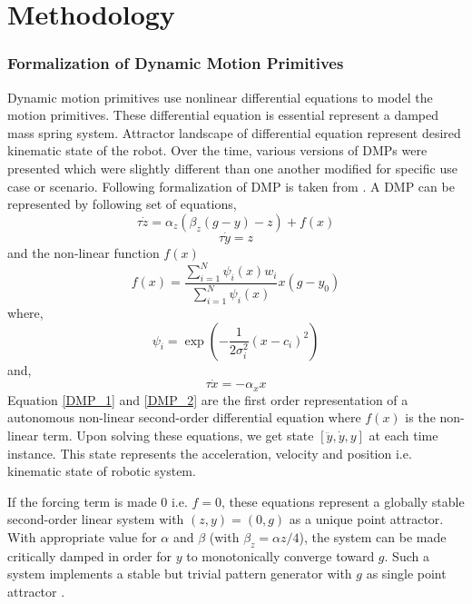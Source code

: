 \chapter{Methodology}


\subsection{Formalization of Dynamic Motion Primitives}

\par Dynamic motion primitives use nonlinear differential equations to model the motion primitives. These differential equation is essential represent a damped mass spring system. Attractor landscape of differential equation represent desired kinematic state of the robot. Over the time, various versions of DMPs were presented which were slightly different than one another modified for specific use case or scenario. Following formalization of DMP is taken from \cite{ijspeert2013dynamical}.
A DMP can be represented by following set of equations,  
\begin{equation}\label{DMP_1}
\tau\dot{z} = \alpha_{z}(\beta_{z}(g - y) - z) + f(x)
\end{equation}
\begin{equation}\label{DMP_2}
\tau \dot{y} = z
\end{equation}
and the non-linear function $f(x)$
\begin{equation}\label{forcing_term}
f(x) = \frac{\sum_{i=1}^{N}\psi_{i}(x)w_{i}}{\sum_{i=1}^{N}\psi_{i}(x)}x(g - y_{0})
\end{equation}
where,
\begin{equation}\label{psi}
\psi_{i} = \exp(-{\frac{1}{2\sigma_{i}^{2}}(x - c_{i})^{2}})
\end{equation}
and,
\begin{equation}\label{canonical}
\tau \dot{x} = -\alpha_{x}x
\end{equation}
Equation \ref{DMP_1} and \ref{DMP_2} are the first order representation of a autonomous non-linear second-order differential equation where $f(x)$ is the non-linear term. 
Upon solving these equations, we get state $[\ddot{y}, \dot{y}, y]$ at each time instance. This state represents the acceleration, velocity and position i.e. kinematic state of robotic system. 

If the forcing term is made 0 i.e. $f = 0$, these equations represent a globally stable second-order linear system with $(z, y) = (0, g)$ as a unique point attractor. With appropriate value for $\alpha$ and $\beta$ (with $\beta_{z} = \alpha{z}/4$), the system can be made critically damped in order for $y$ to monotonically converge toward $g$. Such a system implements a stable but trivial pattern generator with $g$ as single point attractor \cite{ijspeert2013dynamical}.

